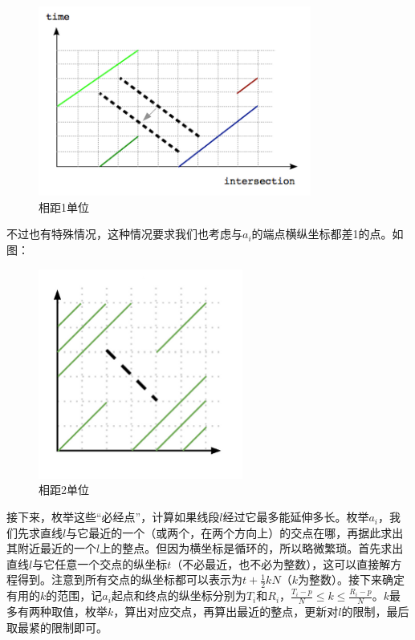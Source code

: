 \documentclass[UTF8]{ctexart}
\theoremstyle{nonumberplain}
\begin{document}
			\begin{figure}[ht]
				\centering
				\includegraphics[width=0.8\textwidth]{figgcj2013a_1.png}
				\caption{相距1单位}
			\end{figure}
			
			不过也有特殊情况，这种情况要求我们也考虑与$a_i$的端点横纵坐标都差1的点。如图：
			
			\begin{figure}[ht]
				\centering
				\includegraphics[width=0.6\textwidth]{figgcj2013a_2.png}
				\caption{相距2单位}
			\end{figure}
			
			接下来，枚举这些“必经点”，计算如果线段$l$经过它最多能延伸多长。枚举$a_i$，我们先求直线$l$与它最近的一个（或两个，在两个方向上）的交点在哪，再据此求出其附近最近的一个$l$上的整点。但因为横坐标是循环的，所以略微繁琐。首先求出直线$l$与它任意一个交点的纵坐标$t$（不必最近，也不必为整数），这可以直接解方程得到。注意到所有交点的纵坐标都可以表示为$t+\frac{1}{2}kN$（$k$为整数）。接下来确定有用的$k$的范围，记$a_i$起点和终点的纵坐标分别为$T_i$和$R_i$，$\frac{T_i-p}{N} \leq k \leq \frac{R_i-p}{N}$。$k$最多有两种取值，枚举$k$，算出对应交点，再算出最近的整点，更新对$l$的限制，最后取最紧的限制即可。
		
\end{document}

